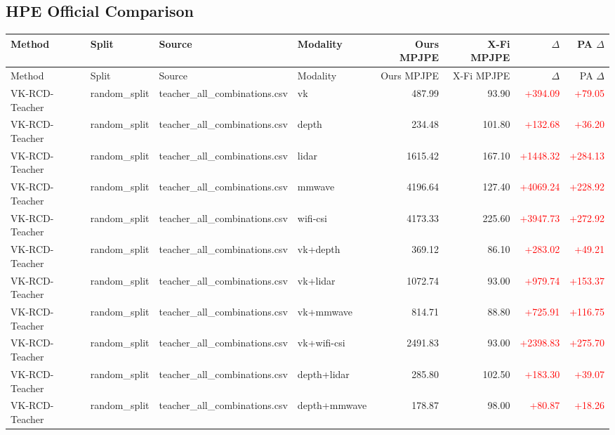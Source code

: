 \documentclass[10pt]{article}
\begin{document}
\subsection*{HPE Official Comparison}
\scriptsize
\begin{longtable}{llllrrrr}
\toprule
Method & Split & Source & Modality & Ours MPJPE & X-Fi MPJPE & $\Delta$ & PA $\Delta$\\
\midrule
\endfirsthead
\toprule
Method & Split & Source & Modality & Ours MPJPE & X-Fi MPJPE & $\Delta$ & PA $\Delta$\\
\midrule
\endhead
VK-RCD-Teacher & random\_split & teacher\_all\_combinations.csv & vk & 487.99 & 93.90 & \textcolor{red}{+394.09} & \textcolor{red}{+79.05}\\
VK-RCD-Teacher & random\_split & teacher\_all\_combinations.csv & depth & 234.48 & 101.80 & \textcolor{red}{+132.68} & \textcolor{red}{+36.20}\\
VK-RCD-Teacher & random\_split & teacher\_all\_combinations.csv & lidar & 1615.42 & 167.10 & \textcolor{red}{+1448.32} & \textcolor{red}{+284.13}\\
VK-RCD-Teacher & random\_split & teacher\_all\_combinations.csv & mmwave & 4196.64 & 127.40 & \textcolor{red}{+4069.24} & \textcolor{red}{+228.92}\\
VK-RCD-Teacher & random\_split & teacher\_all\_combinations.csv & wifi-csi & 4173.33 & 225.60 & \textcolor{red}{+3947.73} & \textcolor{red}{+272.92}\\
VK-RCD-Teacher & random\_split & teacher\_all\_combinations.csv & vk+depth & 369.12 & 86.10 & \textcolor{red}{+283.02} & \textcolor{red}{+49.21}\\
VK-RCD-Teacher & random\_split & teacher\_all\_combinations.csv & vk+lidar & 1072.74 & 93.00 & \textcolor{red}{+979.74} & \textcolor{red}{+153.37}\\
VK-RCD-Teacher & random\_split & teacher\_all\_combinations.csv & vk+mmwave & 814.71 & 88.80 & \textcolor{red}{+725.91} & \textcolor{red}{+116.75}\\
VK-RCD-Teacher & random\_split & teacher\_all\_combinations.csv & vk+wifi-csi & 2491.83 & 93.00 & \textcolor{red}{+2398.83} & \textcolor{red}{+275.70}\\
VK-RCD-Teacher & random\_split & teacher\_all\_combinations.csv & depth+lidar & 285.80 & 102.50 & \textcolor{red}{+183.30} & \textcolor{red}{+39.07}\\
VK-RCD-Teacher & random\_split & teacher\_all\_combinations.csv & depth+mmwave & 178.87 & 98.00 & \textcolor{red}{+80.87} & \textcolor{red}{+18.26}\\

\end{longtable}
\end{document}
